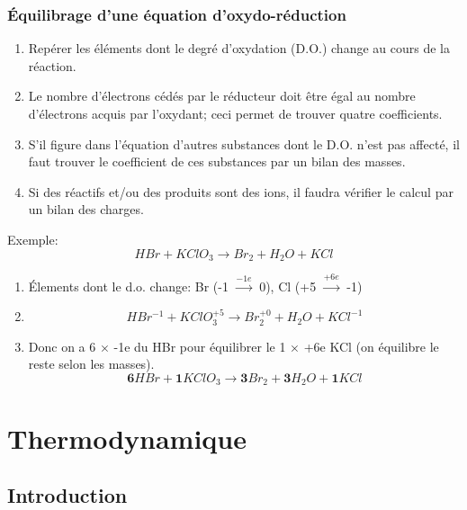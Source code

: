 \documentclass[10pt,a4paper]{book}
\newcommand{\x}{$\times$ }
\begin{document}
\subsection{Équilibrage d'une équation d'oxydo-réduction}

\begin{enumerate}
\item Repérer les éléments dont le degré d’oxydation (D.O.) change au cours de la réaction.
\item Le nombre d’électrons cédés par le réducteur doit être égal au nombre d’électrons acquis par l’oxydant; ceci permet de trouver quatre coefficients.
\item S’il figure dans l’équation d’autres substances dont le D.O. n’est pas affecté, il faut
trouver le coefficient de ces substances par un bilan des masses.
\item Si des réactifs et/ou des produits sont des ions, il faudra vérifier le calcul par un
bilan des charges.
\end{enumerate}
Exemple: 
\begin{displaymath}
HBr + KClO_3 \longrightarrow Br_2 + H_2O + KCl
\end{displaymath}
\begin{enumerate}
\item Élements dont le d.o. change: Br (-1 $\xrightarrow{-1e}$ 0), Cl (+5 $\xrightarrow{+6e}$ -1) 
\item
\begin{displaymath}
HBr^{-1} + KClO_3^{+5} \longrightarrow Br_2^{+0} + H_2O + KCl^{-1} 
\end{displaymath}
\item Donc on a 6 \x -1e du HBr pour équilibrer le 1 \x +6e KCl (on équilibre le reste selon les masses).
\begin{displaymath}
\textbf{6}HBr + \textbf{1}KClO_3 \longrightarrow \textbf{3}Br_2 + \textbf{3}H_2O + \textbf{1}KCl
\end{displaymath}
\end{enumerate}

\chapter{Thermodynamique}

\section{Introduction}
\end{document}
